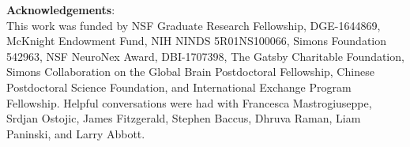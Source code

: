 \documentclass[11pt]{article}
\begin{document}
%
%
%


\textbf{Acknowledgements}: \\
This work was funded by NSF Graduate Research Fellowship,  DGE-1644869, McKnight Endowment Fund, NIH NINDS 5R01NS100066, Simons Foundation 542963, NSF NeuroNex Award, DBI-1707398, The Gatsby Charitable Foundation, Simons Collaboration on the Global Brain Postdoctoral Fellowship, Chinese Postdoctoral Science Foundation, and International Exchange Program Fellowship. 
Helpful conversations were had with Francesca Mastrogiuseppe, Srdjan Ostojic, James Fitzgerald, Stephen Baccus, Dhruva Raman, Liam Paninski, and Larry Abbott.
\end{document}
